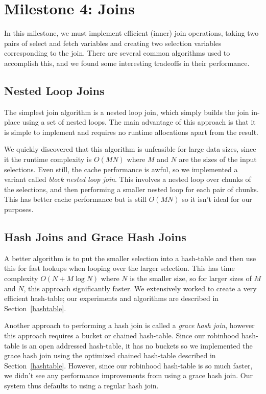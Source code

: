 \documentclass[a4paper, 12pt]{article}
\begin{document}
\section{Milestone 4: Joins}

In this milestone, we must implement efficient (inner) join operations, taking two pairs of select and fetch variables and creating two selection variables corresponding to the join. There are several common algorithms used to accomplish this, and we found some interesting tradeoffs in their performance.

\subsection{Nested Loop Joins}

The simplest join algorithm is a nested loop join, which simply builds the join in-place using a set of nested loops. The main advantage of this approach is that it is simple to implement and requires no runtime allocations apart from the result.

\medskip
We quickly discovered that this algorithm is unfeasible for large data sizes, since it the runtime complexity is $O(MN)$ where $M$ and $N$ are the sizes of the input selections. Even still, the cache performance is awful, so we implemented a variant called \textit{block nested loop join}. This involves a nested loop over chunks of the selections, and then performing a smaller nested loop for each pair of chunks. This has better cache performance but is still $O(MN)$ so it isn't ideal for our purposes.

\subsection{Hash Joins and Grace Hash Joins}
A better algorithm is to put the smaller selection into a hash-table and then use this for fast lookups when looping over the larger selection. This has time complexity $O(N+M\log N)$ where $N$ is the smaller size, so for larger sizes of $M$ and $N$, this approach significantly faster. We extensively worked to create a very efficient hash-table; our experiments and algorithms are described in Section~\ref{hashtable}.

\medskip
Another approach to performing a hash join is called a \textit{grace hash join}, however this approach requires a bucket or chained hash-table. Since our robinhood hash-table is an open addressed hash-table, it has no buckets so we implemented the grace hash join using the optimized chained hash-table described in Section~\ref{hashtable}. However, since our robinhood hash-table is so much faster, we didn't see any performance improvements from using a grace hash join. Our system thus defaults to using a regular hash join.
\end{document}
